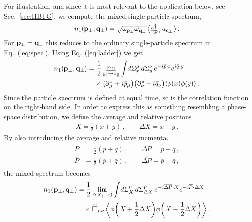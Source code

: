 \documentclass[reprint,superscriptaddress,english,preprintnumbers,amsmath,amssymb,aps,prx]{revtex4-2}
\def\Eq#1{Eq.~(\ref{#1})}
\def\Sec#1{Sec.~\ref{#1}}
\begin{document}
For illustration, and since it is most relevant to the application below, see \Sec{sec:HBTG}, we compute the mixed single-particle spectrum,
\begin{align}\label{eq:n1mixed}
n_1(\bold{p}_{\perp},\bold{q}_{\perp}) = \sqrt{\omega_{\bold{p}_\perp} \omega_{\bold{q}_\perp}}\, \big\langle a_{\bold{p}_\perp}^\dagger a_{\bold{q}_\perp}\big\rangle\,.
\end{align}
For $\bold{p}_\perp = \bold{q}_\perp$ 
this reduces to the ordinary single-particle spectrum in \Eq{eq:spec}. 
Using \Eq{eq:ladder} we get
\begin{align}
\begin{split}
n_1(\bold{p}_\perp,\bold{q}_\perp)  &= \frac{1}{2} \lim_{y_\parallel\rightarrow x_\parallel} \int\!d\Sigma_x^\mu\,d\Sigma_y^\nu\,e^{-i\bar p \cdot x}e^{i\bar q \cdot y}\\
&\quad \times \big( \partial^{x}_{\mu}+i\bar p_\mu\big)\big( \partial^{y}_{\nu}-i\bar q_\nu \big) \langle \phi(x)\phi(y) \rangle\,.
\end{split}
\end{align}
Since the particle spectrum is defined at equal time, so is the correlation function on the right-hand side. In order to express this as something resembling a phase-space distribution, we define the average and relative positions
\begin{align}
X = \frac{1}{2}(x+y)\,,\qquad \Delta X = x-y\,. 
\end{align}
By also introducing the average and relative momenta,
\begin{align}\label{eq:momdef}
\begin{split}
P &= \frac{1}{2}(p+q)\,,\qquad \Delta P = p-q\,,\\
\overline P &= \frac{1}{2}(\bar p+\bar q)\,,\qquad \overline{\Delta P} = \bar p-\bar q\,,
\end{split}
\end{align}
the mixed spectrum becomes
\begin{align}\label{eq:ms1}
\begin{split}
n_1(\bold{p}_\perp,\bold{q}_\perp)&= \frac{1}{2} \lim_{\Delta X_\parallel\rightarrow 0} \int\!d\Sigma_X^\mu\,d\Sigma_{\Delta X}^\nu\,e^{-i\overline{\Delta P}\cdot X}e^{-i\overline P \cdot \Delta X}\\
&\quad\times \widetilde\Box_{\mu\nu}\,  \bigg\langle \phi\bigg(X+\frac{1}{2} \Delta X\bigg)\phi\bigg(X-\frac{1}{2}\Delta X\bigg) \bigg\rangle\,.
\end{split}
\end{align}
\end{document}
